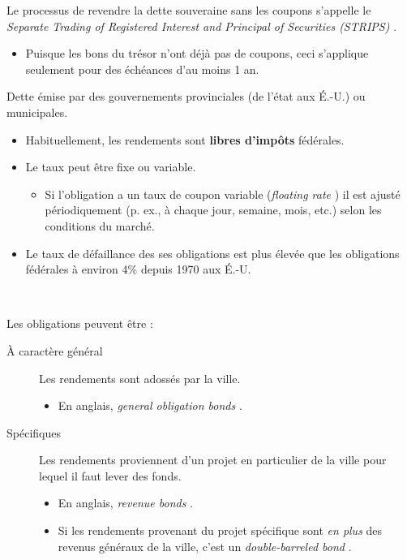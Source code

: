 \documentclass[10pt, french]{article}
\begin{document}
\begin{multicols*}{2}
Le processus de revendre la dette souveraine sans les coupons s'appelle le \og \textit{Separate Trading of Registered Interest and Principal of Securities (STRIPS)} \fg{}.
\begin{itemize}
	\item	Puisque les bons du trésor n'ont déjà pas de coupons, ceci s'applique seulement pour des échéances d'au moins 1 an.
\end{itemize}

\begin{definitionNOHFILLprop}
Dette émise par des gouvernements provinciales (de l'état aux É.-U.) ou municipales.

\begin{itemize}
	\item	Habituellement, les rendements sont \textbf{libres d'impôts} fédérales.
	\item	Le taux peut être fixe ou variable.
		\begin{itemize}
		\item	Si l'obligation a un taux de coupon variable (\og \textit{floating rate} \fg{}) il est ajusté périodiquement (p. ex., à chaque jour, semaine, mois, etc.) selon les conditions du marché.
		\end{itemize}
	\item	Le taux de défaillance des ses obligations est plus élevée que les obligations fédérales à environ 4\% depuis 1970 aux É.-U.
\end{itemize}

\

Les obligations peuvent être : 
\begin{description}
	\item[À caractère général]	Les rendements sont adossés par la ville.
		\begin{itemize}
		\item	En anglais, \og \textit{general obligation bonds} \fg{}.
		\end{itemize}
	\item[Spécifiques]	Les rendements proviennent d'un projet en particulier de la ville pour lequel il faut lever des fonds.
		\begin{itemize}
		\item	En anglais, \og \textit{revenue bonds} \fg{}.
		\item	Si les rendements provenant du projet spécifique sont \textit{en plus} des revenus généraux de la ville, c'est un \og \textit{double-barreled bond} \fg{}.
		\end{itemize}
\end{description}
\end{definitionNOHFILLprop}


\end{multicols*}
\end{document}
